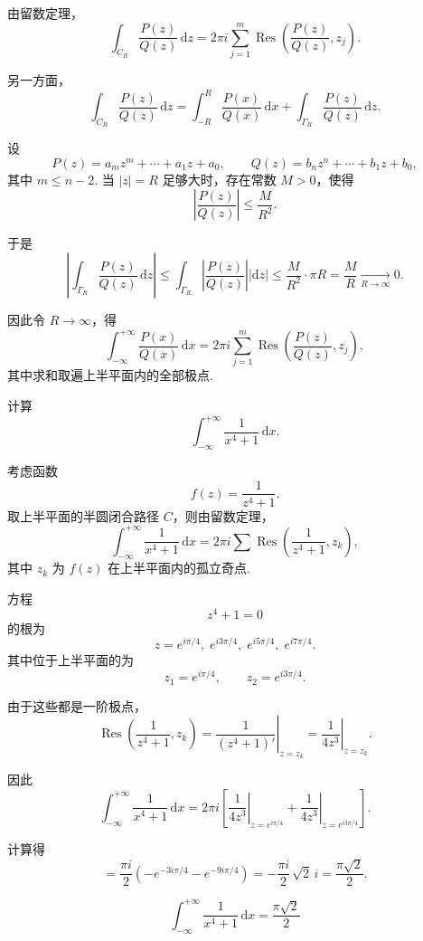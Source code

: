 \documentclass[openany,oneside]{ctexbook}
\begin{document}
由留数定理，
\[
\int_{C_R}\frac{P(z)}{Q(z)}\,\mathrm{d}z
=2\pi i\sum_{j=1}^{m}
\operatorname{Res}\!\left(\frac{P(z)}{Q(z)},z_j\right).
\]

另一方面，
\[
\int_{C_R}\frac{P(z)}{Q(z)}\,\mathrm{d}z
=\int_{-R}^{R}\frac{P(x)}{Q(x)}\,\mathrm{d}x
+\int_{\Gamma_R}\frac{P(z)}{Q(z)}\,\mathrm{d}z.
\]

设
\[
P(z)=a_m z^m+\cdots+a_1 z+a_0,\qquad
Q(z)=b_n z^n+\cdots+b_1 z+b_0,
\]
其中 $m\le n-2$.
当 $|z|=R$ 足够大时，存在常数 $M>0$，使得
\[
\left|\frac{P(z)}{Q(z)}\right|
\le \frac{M}{R^2}.
\]

于是
\[
\left|\int_{\Gamma_R}\frac{P(z)}{Q(z)}\,\mathrm{d}z\right|
\le \int_{\Gamma_R}\left|\frac{P(z)}{Q(z)}\right||\mathrm{d}z|
\le \frac{M}{R^2}\cdot \pi R
=\frac{M}{R}
\xrightarrow[R\to\infty]{}0.
\]

因此令 $R\to\infty$，得
\[
\int_{-\infty}^{+\infty}\frac{P(x)}{Q(x)}\,\mathrm{d}x
=2\pi i\sum_{j=1}^{m}
\operatorname{Res}\!\left(\frac{P(z)}{Q(z)},z_j\right),
\]
其中求和取遍上半平面内的全部极点.
\begin{example}
  计算
\[
\int_{-\infty}^{+\infty} \frac{1}{x^4+1}\,\mathrm{d}x .
\]
\end{example}
\begin{solution}
  考虑函数
\[
f(z)=\frac{1}{z^4+1}.
\]
取上半平面的半圆闭合路径 $C$，则由留数定理，
\[
\int_{-\infty}^{+\infty} \frac{1}{x^4+1}\,\mathrm{d}x
= 2\pi i \sum \operatorname{Res}\left( \frac{1}{z^4+1}, z_k \right),
\]
其中 $z_k$ 为 $f(z)$ 在上半平面内的孤立奇点.

方程
\[
z^4+1=0
\]
的根为
\[
z = e^{i\pi/4},\; e^{i3\pi/4},\; e^{i5\pi/4},\; e^{i7\pi/4}.
\]
其中位于上半平面的为
\[
z_1 = e^{i\pi/4}, \qquad z_2 = e^{i3\pi/4}.
\]

由于这些都是一阶极点，
\[
\operatorname{Res}\left( \frac{1}{z^4+1}, z_k \right)
= \left. \frac{1}{(z^4+1)'} \right|_{z=z_k}
= \left. \frac{1}{4z^3} \right|_{z=z_k}.
\]

因此
\[
\int_{-\infty}^{+\infty} \frac{1}{x^4+1}\,\mathrm{d}x
= 2\pi i \left[
\left. \frac{1}{4z^3} \right|_{z=e^{i\pi/4}}
+
\left. \frac{1}{4z^3} \right|_{z=e^{i3\pi/4}}
\right].
\]

计算得
\[
= \frac{\pi i}{2}
\left(
- e^{-3i\pi/4} - e^{-9i\pi/4}
\right)
= -\frac{\pi i}{2}\,\sqrt{2}\, i
= \frac{\pi\sqrt{2}}{2}.
\]

\[
\boxed{
\int_{-\infty}^{+\infty} \frac{1}{x^4+1}\,\mathrm{d}x
= \frac{\pi\sqrt{2}}{2}
}
\]
\end{solution}
\end{document}

